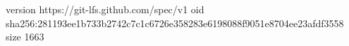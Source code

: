 version https://git-lfs.github.com/spec/v1
oid sha256:281193ee1b733b2742c7c1c6726e358283e6198088f9051e8704ee23afdf3558
size 1663
